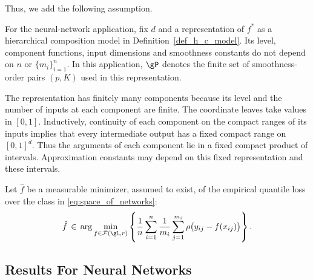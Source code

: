 \documentclass[twoside,11pt]{article}
\newcommand{\rev}[1]{{\color{revisionred}#1}}
\newenvironment{revision}{\color{revisionred}}{}
\begin{document}
Thus, we add the following assumption.
\begin{assumption}
\label{assump_nn}
\begin{revision}
For the neural-network application, fix \(d\) and a representation of
\(f^*\) as a hierarchical composition model in
Definition~\ref{def_h_c_model}. Its level, component functions, input
dimensions and smoothness constants do not depend on \(n\) or
\(\{m_i\}_{i=1}^n\). In this application, \(\gP\) denotes the finite
set of smoothness-order pairs \((p,K)\) used in this representation.
\end{revision}
\end{assumption}

\rev{The representation has finitely many components because its level
and the number of inputs at each component are finite. The coordinate
leaves take values in \([0,1]\). Inductively, continuity of each component
on the compact ranges of its inputs implies that every intermediate
output has a fixed compact range on \([0,1]^d\). Thus the arguments of
each component lie in a fixed compact product of intervals.
Approximation constants may depend on this fixed representation and
these intervals.}

\begin{revision}
Let \(\hat f\) be a measurable minimizer, assumed to exist, of the
empirical quantile loss over the class in
\eqref{eq:space_of_networks}:
\begin{equation}
\label{nn_main_est}
\hat f \,\in\,
\arg\min_{f\in\mathcal F(\gL,r)}
\left\{
\frac{1}{n}\sum_{i=1}^n\frac{1}{m_i}
\sum_{j=1}^{m_i}\rho\bigl(y_{ij}-f(x_{ij})\bigr)
\right\}.
\end{equation}
\end{revision}

\subsection{Results For Neural Networks}
\end{document}
